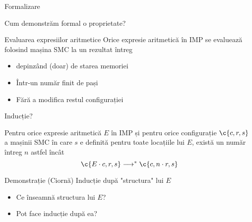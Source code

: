 

\begin{section}{Formalizare}
\begin{frame}{Cum demonstrăm formal o proprietate?}
\begin{block}{Evaluarea expresiilor aritmetice}
Orice expresie aritmetică în IMP se evaluează folosind mașina SMC la un rezultat întreg
\begin{itemize}
\item depinzând (doar) de starea memoriei
\item Într-un număr finit de pași
\item Fără a modifica restul configurației
\end{itemize}
\end{block}

\end{frame}

\begin{frame}{Inducție?}
\begin{theorem}
Pentru orice expresie aritmetică $E$ în IMP și pentru  orice configurație $\c{c,r,s}$ a mașinii SMC în care $s$ e definită pentru toate locațiile lui $E$, există un număr întreg $n$ astfel încât 
$$\c{E\cdot c,  r, s} \longrightarrow^\ast \c{c, n\cdot r, s}$$
\end{theorem}

\begin{block}{Demonstrație (Ciornă)}
Inducție după "structura" lui $E$
\begin{itemize}
\item Ce înseamnă structura lui $E$?
\item Pot face inducție după ea?
\end{itemize}
\end{block}
\end{frame}

\end{section}

